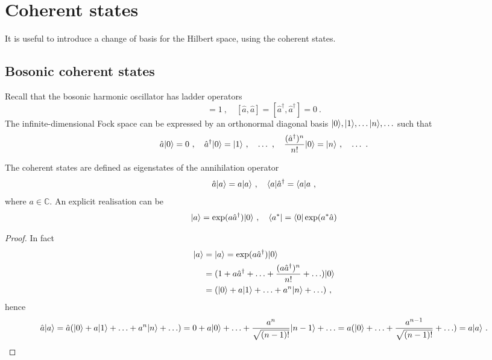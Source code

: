 \chapter{Coherent states}

    It is useful to introduce a change of basis for the Hilbert space, using the coherent states. 

\section{Bosonic coherent states}

    Recall that the bosonic harmonic oscillator has ladder operators 
    \begin{equation*}
        [\hat a, \hat a^\dagger] = 1 ~, \quad [\hat a, \hat a] = [\hat a^\dagger, \hat a^\dagger] = 0 ~.
    \end{equation*}
    The infinite-dimensional Fock space can be expressed by an orthonormal diagonal basis $\vert0\rangle, \vert1\rangle, \ldots \vert n\rangle, \ldots$ such that
    \begin{equation*}
        \hat a \vert0\rangle = 0 ~, \quad \hat a^\dagger \vert0\rangle = \vert1\rangle ~, \quad \ldots ~, \quad \frac{(\hat a^\dagger)^n}{n!} \vert0\rangle = \vert n\rangle ~, \quad \ldots ~.
    \end{equation*}

    The coherent states are defined as eigenstates of the annihilation operator 
    \begin{equation*}
        \hat a \vert a\rangle = a \vert a\rangle ~, \quad \langle a\vert \hat a^\dagger = \langle a\vert a ~,
    \end{equation*}
    where $a \in \mathbb C$. An explicit realisation can be 
    \begin{equation*}
        \vert a\rangle = \exp(a \hat a^\dagger) \vert0\rangle ~, \quad \langle a^*\vert = \langle0\vert \exp(a^* \hat a)
    \end{equation*}
    \begin{proof}
        In fact 
        \begin{equation*}
        \begin{aligned}
            \vert a\rangle & = \vert a\rangle = \exp(a \hat a^\dagger) \vert0\rangle \\ & = (1 + a \hat a^\dagger + \ldots + \frac{(a \hat a^\dagger)^n}{n!} + \ldots) \vert0\rangle \\ & =  (\vert0\rangle + a \vert1\rangle + \ldots + a^n \vert n\rangle + \ldots)  ~,
        \end{aligned}
        \end{equation*}
        hence 
        \begin{equation*}
        \begin{aligned}
            \hat a \vert a\rangle = \hat a (\vert0\rangle + a \vert1\rangle + \ldots + a^n \vert n\rangle + \ldots) = 0 + a \vert0\rangle + \ldots + \frac{a^n}{\sqrt{(n-1)!}} \vert n-1\rangle + \ldots = a (\vert0\rangle + \ldots + \frac{a^{n-1}}{\sqrt{(n-1)!}} + \ldots) = a \vert a\rangle ~.
        \end{aligned}
        \end{equation*}
    \end{proof}

